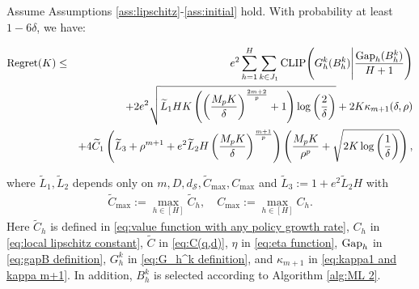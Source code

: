 \documentclass[final,supplement]{siamart251216}
\begin{document}
\begin{theorem}\label{thm:first stage regret decomposition}

 Assume Assumptions \ref{ass:lipschitz}-\ref{ass:initial} hold. With probability at least $1-6\delta$, we have:

\begin{eqnarray}\label{eq:regret_second}
{\rm Regret}(K)
&\leq&
e^{2}\sum_{h=1}^{H}\sum_{k\in J_{1}}
{\rm CLIP}\Bigg(
G_{h}^{k}(B_h^k)
\Bigg|
\frac{{\rm Gap}_{h}(B_h^k)}{H+1}
\Bigg)
\\
&&+
2e^{2}\sqrt{
\widetilde{L}_{1}HK
\left(
\left(\frac{M_{p}K}{\delta}\right)^{\frac{2m+2}{p}}
+1
\right)
\log\left(\frac{2}{\delta}\right)}
+
2K\kappa_{m+1}(\delta,\rho)
\nonumber\\
&&+4\widetilde{C}_{1}
\left(
\widetilde{L}_{3}+\rho^{m+1}
+e^{2}\widetilde{L}_{2}H
\left(\frac{M_{p}K}{\delta}\right)^{\frac{m+1}{p}}
\right)
\left(
\frac{M_{p}K}{\rho^{p}}
+\sqrt{2K\log\left(\frac{1}{\delta}\right)}
\right),\nonumber
\end{eqnarray}

where $\widetilde{L}_{1}, \widetilde{L}_{2}$ depends only on $m, D, d_{\mathcal{S}},\widetilde{C}_{\max}, C_{\max} $ and $\widetilde{L}_{3}:=1+e^{2}\widetilde{L}_{2}H$
with 
\begin{eqnarray}\label{eq:widetilde Cmax,Cmax}
\widetilde{C}_{\max}:=\max_{h\in[H]}\widetilde{C}_{h},\quad C_{\max}:=\max_{h\in[H]}C_{h}.
\end{eqnarray}
Here $\widetilde{C}_{h}$ is defined in \eqref{eq:value function with any policy growth rate}, $C_{h}$  in \eqref{eq:local lipschitz constant}, $\widetilde{C}$  in \eqref{eq:C(q,d)}, $\eta$  in \eqref{eq:eta function}, ${\rm Gap}_h$  in \eqref{eq:gapB definition}, $G_{h}^{k}$  in \eqref{eq:G_h^k definition}, and $\kappa_{m+1}$  in \eqref{eq:kappa1 and kappa m+1}. In addition, $B_h^k$ is selected according to Algorithm \ref{alg:ML 2}.
\end{theorem}
\end{document}
